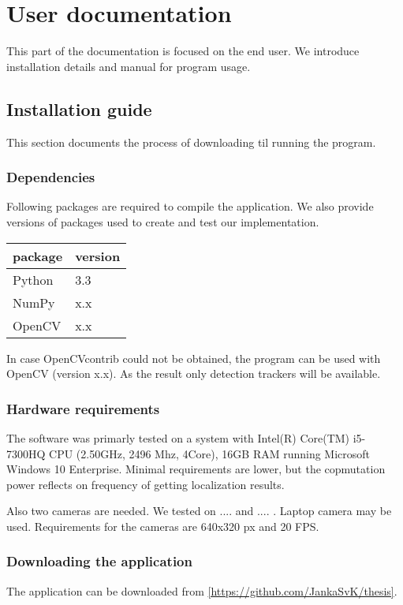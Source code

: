 \chapter{User documentation}
This part of the documentation is focused on the end user. We introduce
installation details and manual for program usage.

\section{Installation guide}
This section documents the process of downloading til running the program.

\subsection{Dependencies}
Following packages are required to compile the application. We also provide
versions of packages used to create and test our implementation.

\begin{center}
\begin{tabular}{l l}
	package	&	version \\ \hline
	Python	&	3.3 \\
	NumPy	&	x.x \\
	OpenCV	&	x.x 
\end{tabular}
\end{center}

In case OpenCVcontrib could not be obtained, the program can be used with
OpenCV (version x.x). As the result only detection trackers will be available.

\subsection{Hardware requirements}
The software was primarly tested on a system with Intel(R) Core(TM) i5-7300HQ
CPU (2.50GHz, 2496 Mhz, 4Core), 16GB RAM running Microsoft Windows 10
Enterprise. Minimal requirements are lower, but the copmutation power reflects
on frequency of getting localization results.

Also two cameras are needed. We tested on .... and .... . Laptop camera may be
used. Requirements for the cameras are 640x320 px and 20 FPS.

\subsection{Downloading the application}
The application can be downloaded from \ref{https://github.com/JankaSvK/thesis}.


